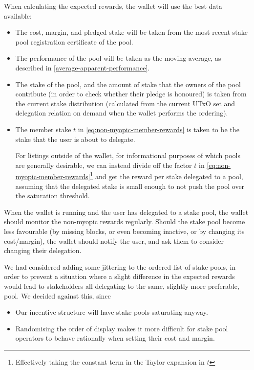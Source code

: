 \documentclass[11pt,a4paper,dvipsnames,twosided]{article}
\begin{document}
When calculating the expected rewards, the wallet will use the
best data available:
\begin{itemize}
\item The cost, margin, and pledged stake will be taken from the most
  recent stake pool registration certificate of the pool.
\item The performance of the pool will be taken as the moving average, as
  described in \cref{average-apparent-performance}.
\item The stake of the pool, and the amount of stake that the owners
  of the pool contribute (in order to check whether their pledge is
  honoured) is taken from the current stake distribution (calculated
  from the current UTxO set and delegation relation on demand when the
  wallet performs the ordering).
\item The member stake \(t\) in \cref{eq:non-myopic-member-rewards} is taken to
  be the stake that the user is about to delegate.

  For listings outside of the wallet, for informational purposes of which pools
  are generally desirable, we can instead divide off the factor \(t\) in
  \cref{eq:non-myopic-member-rewards}\footnote{Effectively taking the constant
    term in the Taylor expansion in \(t\)} and get the reward per stake
  delegated to a pool, assuming that the delegated stake is small enough to not
  push the pool over the saturation threshold.
\end{itemize}

When the wallet is running and the user has delegated to a stake pool, the
wallet should monitor the non-myopic rewards regularly. Should the stake pool
become less favourable (by missing blocks, or even becoming inactive, or by
changing its cost/margin), the wallet should notify the user, and ask them to
consider changing their delegation.

We had considered adding some jittering to the ordered list of stake pools, in
order to prevent a situation where a slight difference in the expected rewards would
lead to stakeholders all delegating to the same, slightly more preferable, pool.
We decided against this, since
\begin{itemize}
\item Our incentive structure will have stake pools saturating anyway.
\item Randomising the order of display makes it more difficult for stake pool
  operators to behave rationally when setting their cost and margin.
\end{itemize}
\end{document}
